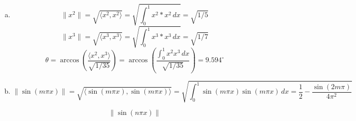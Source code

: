 \documentclass[12pt]{article}
\begin{document}
\section{}
\begin{enumerate}[(a)]
	\item \[ \|x^2\| = \sqrt{\langle x^2, x^2 \rangle} = \sqrt{\int_{0}^{1} x^2 * x^2 \,dx} = \sqrt{1/5}\]
	\[ \|x^3\| = \sqrt{\langle x^3, x^3 \rangle} = \sqrt{\int_{0}^{1} x^3 * x^3 \,dx} = \sqrt{1/7}\]
	\[\theta = \arccos\left(\dfrac{\langle x^2, x^3 \rangle}{\sqrt{1/35}}\right) = \arccos\left(\dfrac{\int_{0}^{1} x^2 x^3 \,dx}{\sqrt{1/35}}\right) = 9.594^{\circ}\]
	
	\item \[ \|\sin(m\pi x)\| = \sqrt{\langle \sin(m\pi x), \sin(m\pi x) \rangle} = \sqrt{\int_{0}^{1} \sin(m\pi x)\sin(m\pi x)\, dx = \dfrac{1}{2} - \dfrac{\sin(2m\pi )}{4\pi^2}}\]
	
	\[\|\sin(n\pi x)\|  \]
\end{enumerate}
\end{document}
